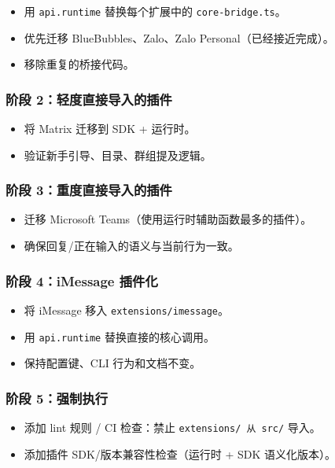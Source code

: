 \begin{itemize}
  \item 用 \texttt{api.runtime} 替换每个扩展中的 \texttt{core-bridge.ts}。
  \item 优先迁移 BlueBubbles、Zalo、Zalo Personal（已经接近完成）。
  \item 移除重复的桥接代码。
\end{itemize}


\subsubsection{阶段 2：轻度直接导入的插件}


\begin{itemize}
  \item 将 Matrix 迁移到 SDK + 运行时。
  \item 验证新手引导、目录、群组提及逻辑。
\end{itemize}


\subsubsection{阶段 3：重度直接导入的插件}


\begin{itemize}
  \item 迁移 Microsoft Teams（使用运行时辅助函数最多的插件）。
  \item 确保回复/正在输入的语义与当前行为一致。
\end{itemize}


\subsubsection{阶段 4：iMessage 插件化}


\begin{itemize}
  \item 将 iMessage 移入 \texttt{extensions/imessage}。
  \item 用 \texttt{api.runtime} 替换直接的核心调用。
  \item 保持配置键、CLI 行为和文档不变。
\end{itemize}


\subsubsection{阶段 5：强制执行}


\begin{itemize}
  \item 添加 lint 规则 / CI 检查：禁止 \texttt{extensions/\textbf{} 从 \texttt{src/}} 导入。
  \item 添加插件 SDK/版本兼容性检查（运行时 + SDK 语义化版本）。
\end{itemize}


